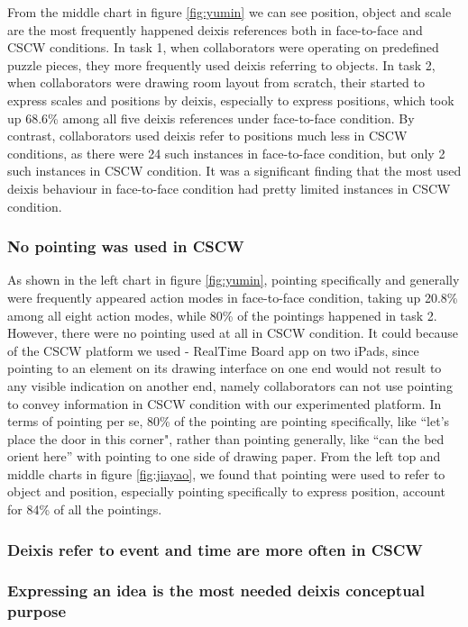 \documentclass[12pt,twoside]{article}
\begin{document}
From the middle chart in figure \ref{fig:yumin} we can see position, object and scale are the most frequently happened deixis references both in face-to-face and CSCW conditions. In task 1, when collaborators were operating on predefined puzzle pieces, they more frequently used deixis referring to objects. In task 2, when collaborators were drawing room layout from scratch, their started to express scales and positions by deixis, especially to express positions, which took up 68.6\% among all five deixis references under face-to-face condition. By contrast, collaborators used deixis refer to positions much less in CSCW conditions, as there were 24 such instances in face-to-face condition, but only 2 such instances in CSCW condition. It was a significant finding that the most used deixis behaviour in face-to-face condition had pretty limited instances in CSCW condition.

\subsubsection{No pointing was used in CSCW}
As shown in the left chart in figure \ref{fig:yumin}, pointing specifically and generally were frequently appeared action modes in face-to-face condition, taking up 20.8\% among all eight action modes, while 80\% of the pointings happened in task 2. However, there were no pointing used at all in CSCW condition. It could because of the CSCW platform we used - RealTime Board app on two iPads, since pointing to an element on its drawing interface on one end would not result to any visible indication on another end, namely collaborators can not use pointing to convey information in CSCW condition with our experimented platform. In terms of pointing per se, 80\% of the pointing are pointing specifically, like ``let's place the door in this corner", rather than pointing generally, like ``can the bed orient here'' with pointing to one side of drawing paper. From the left top and middle charts in figure \ref{fig:jiayao}, we found that pointing were used to refer to object and position, especially pointing specifically to express position, account for 84\% of all the pointings. 

\subsubsection{Deixis refer to event and time are more often in CSCW}


\subsubsection{Expressing an idea is the most needed deixis conceptual purpose}
\end{document}
